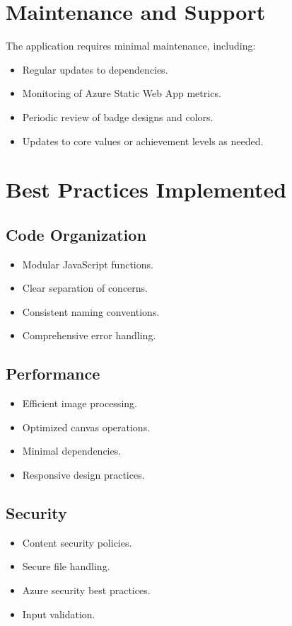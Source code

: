 \documentclass[12pt]{article}
\begin{document}
\section{Maintenance and Support}
The application requires minimal maintenance, including:
\begin{itemize}
    \item Regular updates to dependencies.
    \item Monitoring of Azure Static Web App metrics.
    \item Periodic review of badge designs and colors.
    \item Updates to core values or achievement levels as needed.
\end{itemize}

\section{Best Practices Implemented}
\subsection{Code Organization}
\begin{itemize}
    \item Modular JavaScript functions.
    \item Clear separation of concerns.
    \item Consistent naming conventions.
    \item Comprehensive error handling.
\end{itemize}

\subsection{Performance}
\begin{itemize}
    \item Efficient image processing.
    \item Optimized canvas operations.
    \item Minimal dependencies.
    \item Responsive design practices.
\end{itemize}

\subsection{Security}
\begin{itemize}
    \item Content security policies.
    \item Secure file handling.
    \item Azure security best practices.
    \item Input validation.
\end{itemize}
\end{document}
